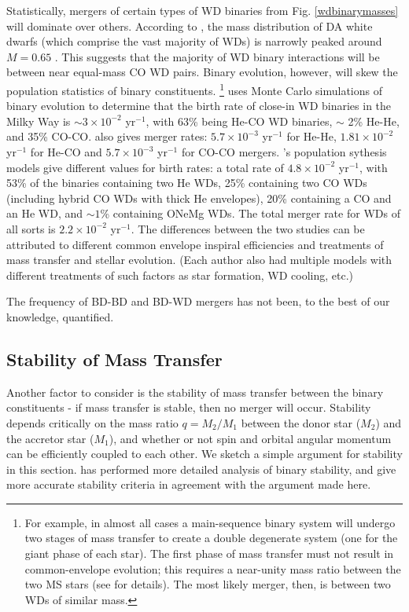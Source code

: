 Statistically, mergers of certain types of WD binaries from Fig. \ref{wdbinarymasses} will dominate over others.  According to \cite{tremblay}, the mass distribution of DA white dwarfs (which comprise the vast majority of WDs) is narrowly peaked around $M = 0.65$ \Msun.  This suggests that the majority of WD binary interactions will be between near equal-mass CO WD pairs.  Binary evolution, however, will skew the population statistics of binary constituents.  \footnote{For example, in almost all cases a main-sequence binary system will undergo two stages of mass transfer to create a double degenerate system (one for the giant phase of each star).  The first phase of mass transfer must not result in common-envelope evolution; this requires a near-unity mass ratio between the two MS stars (see \cite{vkercj10} for details).  The most likely merger, then, is between two WDs of similar mass.}  \cite{han98} uses Monte Carlo simulations of binary evolution to determine that the birth rate of close-in WD binaries in the Milky Way is $\sim 3 \times 10^{-2}$ yr$^{-1}$, with 63\% being He-CO WD binaries, $\sim$ 2\% He-He, and 35\% CO-CO.  \citeauthor{han98} also gives merger rates: $5.7 \times 10^{-3}$ yr$^{-1}$ for He-He, $1.81 \times 10^{-2}$ yr$^{-1}$ for He-CO and $5.7 \times 10^{-3}$ yr$^{-1}$ for CO-CO mergers.  \cite{nele+01a}'s population sythesis models give different values for birth rates: a total rate of $4.8 \times 10^{-2}$ yr$^{-1}$, with 53\% of the binaries containing two He WDs, 25\% containing two CO WDs (including hybrid CO WDs with thick He envelopes), 20\% containing a CO and an He WD, and $\sim 1$\% containing ONeMg WDs.  The total merger rate for WDs of all sorts is $2.2 \times 10^{-2}$ yr$^{-1}$.  The differences between the two studies can be attributed to different common envelope inspiral efficiencies and treatments of mass transfer and stellar evolution.  (Each author also had multiple models with different treatments of such factors as star formation, WD cooling, etc.)

The frequency of BD-BD and BD-WD mergers has not been, to the best of our knowledge, quantified.

\subsection{Stability of Mass Transfer}
\label{ssec:stabilityofmasstransfer}

Another factor to consider is the stability of mass transfer between the binary constituents - if mass transfer is stable, then no merger will occur.  Stability depends critically on the mass ratio $q = M_2/M_1$ between the donor star ($M_2$) and the accretor star ($M_1$), and whether or not spin and orbital angular momentum can be efficiently coupled to each other.  We sketch a simple argument for stability in this section.  \cite{marsns04} has performed more detailed analysis of binary stability, and give more accurate stability criteria in agreement with the argument made here.

